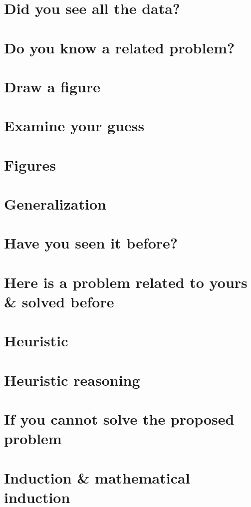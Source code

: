 \documentclass[oneside]{book}
\numberwithin{equation}{section}
\begin{document}
\section*{Did you see all the data?}

\section*{Do you know a related problem?}

\section*{Draw a figure}

\section*{Examine your guess}

\section*{Figures}

\section*{Generalization}

\section*{Have you seen it before?}

\section*{Here is a problem related to yours \& solved before}

\section*{Heuristic}

\section*{Heuristic reasoning}

\section*{If you cannot solve the proposed problem}

\section*{Induction \& mathematical induction}
\end{document}
